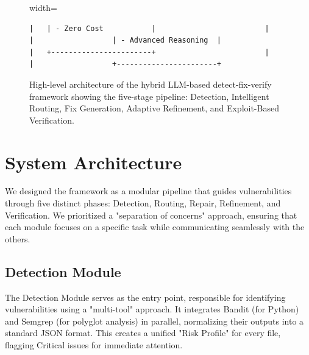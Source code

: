 \documentclass[conference]{IEEEtran}
\begin{document}
\begin{figure}[t]
\begin{adjustbox}{width=\textwidth}
\begin{small}
\begin{verbatim}
|   | - Zero Cost           |                         |    |                  | - Advanced Reasoning  |
|   +-----------------------+                         |    |                  +-----------------------+
\end{verbatim}
\end{small}
\end{adjustbox}
\caption{High-level architecture of the hybrid LLM-based detect-fix-verify framework showing the five-stage pipeline: Detection, Intelligent Routing, Fix Generation, Adaptive Refinement, and Exploit-Based Verification.}
\label{fig:architecture}
\end{figure}

\section{System Architecture}

We designed the framework as a modular pipeline that guides vulnerabilities through five distinct phases: Detection, Routing, Repair, Refinement, and Verification. We prioritized a "separation of concerns" approach, ensuring that each module focuses on a specific task while communicating seamlessly with the others.

\subsection{Detection Module}
The Detection Module serves as the entry point, responsible for identifying vulnerabilities using a "multi-tool" approach. It integrates Bandit (for Python) and Semgrep (for polyglot analysis) in parallel, normalizing their outputs into a standard JSON format. This creates a unified "Risk Profile" for every file, flagging Critical issues for immediate attention.
\end{document}
